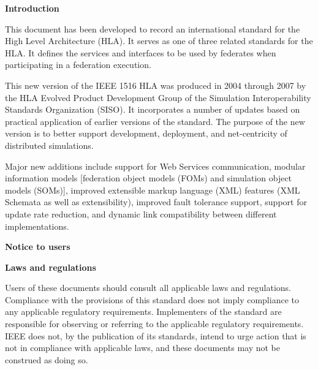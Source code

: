 \setcounter{page}{4}
\thispagestyle{front}
{\sffamily\bfseries\fontsize{13}{15}\selectfont Introduction\par}

\vspace{6pt}
\noindent{}
\vspace{10pt}

This document has been developed to record an international standard for the High Level Architecture (HLA). It serves as one of three related standards for the HLA. It defines the services and interfaces to be used by federates when participating in a federation execution.

This new version of the IEEE 1516 HLA was produced in 2004 through 2007 by the HLA Evolved Product Development Group of the Simulation Interoperability Standards Organization (SISO). It incorporates a number of updates based on practical application of earlier versions of the standard. The purpose of the new version is to better support development, deployment, and net-centricity of distributed simulations.

Major new additions include support for Web Services communication, modular information models [federation object models (FOMs) and simulation object models (SOMs)], improved extensible markup language (XML) features (XML Schemata as well as extensibility), improved fault tolerance support, support for update rate reduction, and dynamic link compatibility between different implementations.

\vspace{0.08in}
{\sffamily\bfseries\fontsize{11}{13}\selectfont Notice to users\par}

\textbf{Laws and regulations}

Users of these documents should consult all applicable laws and regulations. Compliance with the provisions of this standard does not imply compliance to any applicable regulatory requirements. Implementers of the standard are responsible for observing or referring to the applicable regulatory requirements. IEEE does not, by the publication of its standards, intend to urge action that is not in compliance with applicable laws, and these documents may not be construed as doing so.

